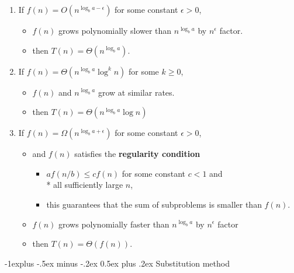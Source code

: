 \documentclass[10pt, landscape]{article}
\makeatletter
\renewcommand{\subsection}{\@startsection{subsection}{2}{0mm}%
  {-1explus -.5ex minus -.2ex}%
  {0.5ex plus .2ex}%
{\normalfont\normalsize\bfseries}}
\makeatother
\begin{document}
\begin{multicols*}{4}
  \begin{enumerate}
    \item If $f(n) = O(n^{\log_b a-\epsilon})$ for some constant  $\epsilon > 0$, 
      \begin{itemize}
        \item $f(n)$ grows polynomially slower than $n^{\log_ba}$ by $n^\epsilon$ factor.
        \item then $T(n) = \Theta(n^{\log_ba})$.
      \end{itemize}
    \item If $f(n) = \Theta(n^{\log_ba} \log^kn) $ for some $k \geq 0$,
      \begin{itemize}
        \item $f(n)$ and $n^{\log_ba}$ grow at similar rates.
        \item then $T(n) = \Theta(n^{\log_ba}\log n)$
      \end{itemize}
    \item If $f(n) = \Omega(n^{\log_ba + \epsilon})$ for some constant $\epsilon > 0$, 
      \begin{itemize}
        \item and $f(n)$ satisfies the \textbf{regularity condition} 
          \begin{itemize}
            \item $af(n/b) \leq cf(n)$ for some constant $c<1$ and \\* all sufficiently large $n$, 
            \item this guarantees that the sum of subproblems is smaller than $f(n)$.
          \end{itemize} 
        \item $f(n)$ grows polynomially faster than $n^{\log_ba}$ by $n^\epsilon$ factor
        \item then $T(n) = \Theta(f(n))$.
      \end{itemize}
  \end{enumerate}

  \subsection{Substitution method}


\end{multicols*}
\end{document}
